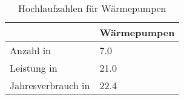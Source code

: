 {
\renewcommand{\arraystretch}{1.2}%
\begin{table}[H]
	\begin{center}
		\caption{Hochlaufzahlen für Wärmepumpen}
		\begin{tabu} to 0.7\textwidth {X[1] X[1, r]}
			\hline
										 & Wärmepumpen \\ \hline
			Anzahl in \si{\MioStkSC}     & \num{7.0}   \\
			Leistung in \si{\gw}         & \num{21.0}  \\
			Jahresverbrauch in \si{\twh} & \num{22.4}  \\ \hline
		\end{tabu}
		\label{tab:WP-RampUp}
	\end{center}
	\vspace{-3mm}%
\end{table}
}